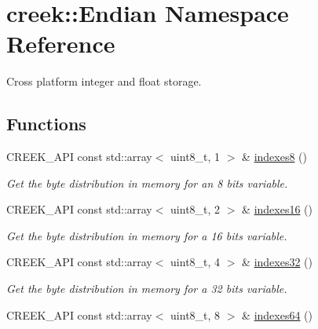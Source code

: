 \hypertarget{namespacecreek_1_1_endian}{}\section{creek\+:\+:Endian Namespace Reference}
\label{namespacecreek_1_1_endian}


Cross platform integer and float storage.  


\subsection*{Functions}
\begin{DoxyCompactItemize}
\item 
C\+R\+E\+E\+K\+\_\+\+A\+PI const std\+::array$<$ uint8\+\_\+t, 1 $>$ \& \hyperlink{namespacecreek_1_1_endian_a1b905d3f3a4345315c226004abaff806}{indexes8} ()\hypertarget{namespacecreek_1_1_endian_a1b905d3f3a4345315c226004abaff806}{}\label{namespacecreek_1_1_endian_a1b905d3f3a4345315c226004abaff806}

\begin{DoxyCompactList}\small\item\em Get the byte distribution in memory for an 8 bits variable. \end{DoxyCompactList}\item 
C\+R\+E\+E\+K\+\_\+\+A\+PI const std\+::array$<$ uint8\+\_\+t, 2 $>$ \& \hyperlink{namespacecreek_1_1_endian_a738658b8c3c04cc343a58ae4d7e69b23}{indexes16} ()\hypertarget{namespacecreek_1_1_endian_a738658b8c3c04cc343a58ae4d7e69b23}{}\label{namespacecreek_1_1_endian_a738658b8c3c04cc343a58ae4d7e69b23}

\begin{DoxyCompactList}\small\item\em Get the byte distribution in memory for a 16 bits variable. \end{DoxyCompactList}\item 
C\+R\+E\+E\+K\+\_\+\+A\+PI const std\+::array$<$ uint8\+\_\+t, 4 $>$ \& \hyperlink{namespacecreek_1_1_endian_a1fc2221b41cd09553d8f7becf25244ee}{indexes32} ()\hypertarget{namespacecreek_1_1_endian_a1fc2221b41cd09553d8f7becf25244ee}{}\label{namespacecreek_1_1_endian_a1fc2221b41cd09553d8f7becf25244ee}

\begin{DoxyCompactList}\small\item\em Get the byte distribution in memory for a 32 bits variable. \end{DoxyCompactList}\item 
C\+R\+E\+E\+K\+\_\+\+A\+PI const std\+::array$<$ uint8\+\_\+t, 8 $>$ \& \hyperlink{namespacecreek_1_1_endian_a08cd4ef75d31f74002ac265863424192}{indexes64} ()\hypertarget{namespacecreek_1_1_endian_a08cd4ef75d31f74002ac265863424192}{}\label{namespacecreek_1_1_endian_a08cd4ef75d31f74002ac265863424192}


\end{DoxyCompactItemize}
